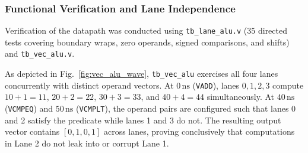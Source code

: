 \subsubsection{Functional Verification and Lane Independence}
Verification of the datapath was conducted using \texttt{tb\_lane\_alu.v} (35 directed tests covering boundary wraps, zero operands, signed comparisons, and shifts) and \texttt{tb\_vec\_alu.v}.

As depicted in Fig.~\ref{fig:vec_alu_wave}, \texttt{tb\_vec\_alu} exercises all four lanes concurrently with distinct operand vectors. At $0\,\text{ns}$ (\texttt{VADD}), lanes $0, 1, 2, 3$ compute $10+1=11$, $20+2=22$, $30+3=33$, and $40+4=44$ simultaneously. At $40\,\text{ns}$ (\texttt{VCMPEQ}) and $50\,\text{ns}$ (\texttt{VCMPLT}), the operand pairs are configured such that lanes 0 and 2 satisfy the predicate while lanes 1 and 3 do not. The resulting output vector contains $[0, 1, 0, 1]$ across lanes, proving conclusively that computations in Lane 2 do not leak into or corrupt Lane 1.
